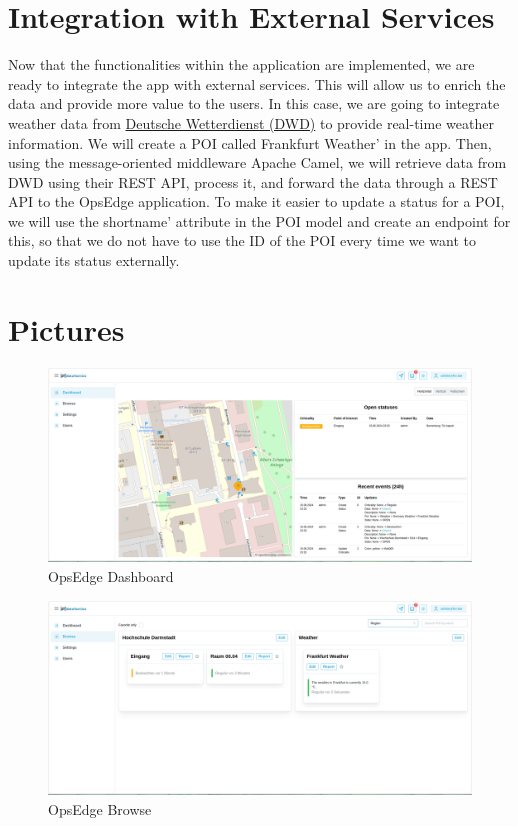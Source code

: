 \section{Integration with External Services}
\label{sec:internship_experience:integration_external_services}

Now that the functionalities within the application are implemented, we are ready to integrate the app with external services. This will allow us to enrich the data and provide more value to the users. In this case, we are going to integrate weather data from \href{https://www.dwd.de/DE/Home/home_node.html}{Deutsche Wetterdienst (DWD)} to provide real-time weather information. We will create a POI called Frankfurt Weather' in the app. Then, using the message-oriented middleware Apache Camel, we will retrieve data from DWD using their REST API, process it, and forward the data through a REST API to the OpsEdge application. To make it easier to update a status for a POI, we will use the shortname' attribute in the POI model and create an endpoint for this, so that we do not have to use the ID of the POI every time we want to update its status externally.

\section{Pictures}
\label{sec:internship_experience:pictures}

\begin{figure}[h]
    \centering
    \includegraphics[width=1\textwidth]{gfx/opsedge-dashboard.png}
    \caption{OpsEdge Dashboard}
    \label{fig:opsedge_dashboard}
\end{figure}

\begin{figure}[h]
    \centering
    \includegraphics[width=1\textwidth]{gfx/opsedge-browse-group-by-region.png}
    \caption{OpsEdge Browse}
    \label{fig:opsedge_browse}
\end{figure}

